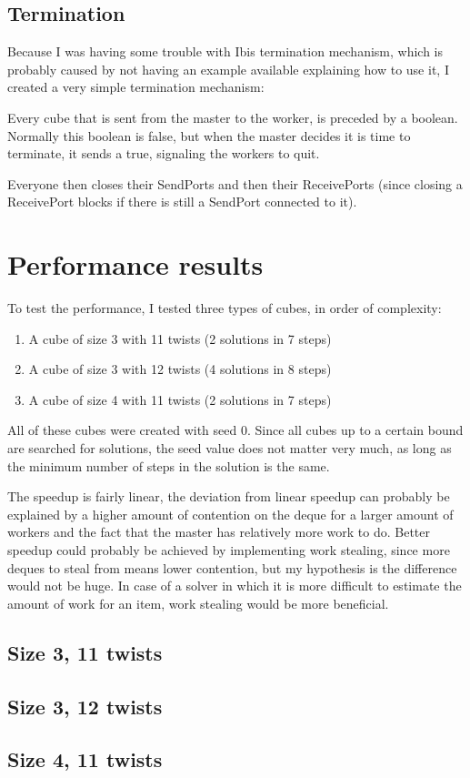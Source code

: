 \documentclass[11pt,a4paper]{article}
\begin{document}
\subsection{Termination}
Because I was having some trouble with Ibis termination mechanism, which is probably caused by not having an example available explaining how to use it, I created a very simple termination mechanism:

Every cube that is sent from the master to the worker, is preceded by a boolean. Normally this boolean is false, but when the master decides it is time to terminate, it sends a true, signaling the workers to quit.

Everyone then closes their SendPorts and then their ReceivePorts (since closing a ReceivePort blocks if there is still a SendPort connected to it).

\section{Performance results}
To test the performance, I tested three types of cubes, in order of complexity:
\begin{enumerate}
\item A cube of size 3 with 11 twists (2 solutions in 7 steps)
\item A cube of size 3 with 12 twists (4 solutions in 8 steps)
\item A cube of size 4 with 11 twists (2 solutions in 7 steps)
\end{enumerate}
All of these cubes were created with seed 0. Since all cubes up to a certain bound are searched for solutions, the seed value does not matter very much, as long as the minimum number of steps in the solution is the same.

The speedup is fairly linear, the deviation from linear speedup can probably be explained by a higher amount of contention on the deque for a larger amount of workers and the fact that the master has relatively more work to do. Better speedup could probably be achieved by implementing work stealing, since more deques to steal from means lower contention, but my hypothesis is the difference would not be huge. In case of a solver in which it is more difficult to estimate the amount of work for an item, work stealing would be more beneficial.

\subsection{Size 3, 11 twists}

\subsection{Size 3, 12 twists}

\subsection{Size 4, 11 twists}
\end{document}
